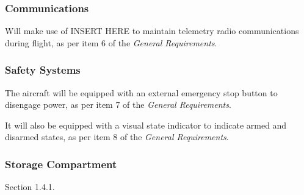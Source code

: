 \subsubsection{Communications}
Will make use of INSERT HERE to maintain telemetry radio communications during flight, as per item 6 of the \textit{General Requirements}.

\subsubsection{Safety Systems}
The aircraft will be equipped with an external emergency stop button to disengage power, as per item 7 of the \textit{General Requirements}.

It will also be equipped with a visual state indicator to indicate armed and disarmed states, as per item 8 of the \textit{General Requirements}.

\subsubsection{Storage Compartment}
Section 1.4.1.